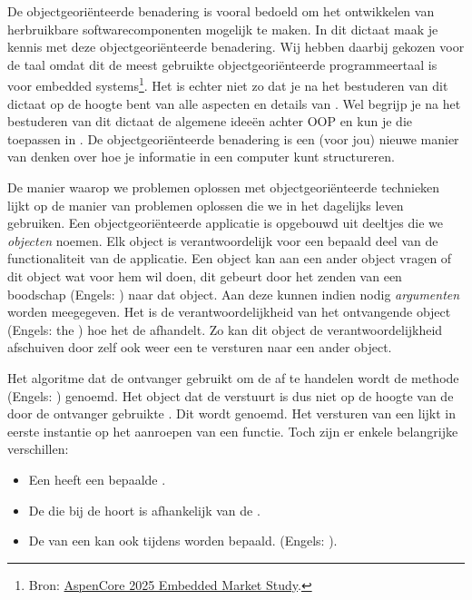 \begin{cpplstShortInline}
De objectgeoriënteerde benadering is vooral bedoeld om het ontwikkelen van herbruikbare softwarecomponenten mogelijk te maken.
In dit dictaat maak je kennis met deze objectgeoriënteerde benadering.
Wij hebben daarbij gekozen voor de taal \Cpp{} omdat dit de meest gebruikte objectgeoriënteerde programmeertaal is voor embedded systems\footnote{%
    Bron: \href{https://github.com/HR-ELEKTRO/ems3/wiki/Documenten/Aspencore_2025_Embedded_Markets_Study.pdf\#page=9}{AspenCore 2025 Embedded Market Study}.
}.
Het is echter niet zo dat je na het bestuderen van dit dictaat op de hoogte bent van alle aspecten en details van \Cpp{}.
Wel begrijp je na het bestuderen van dit dictaat de algemene ideeën achter OOP en kun je die toepassen in \Cpp{}.
De objectgeoriënteerde benadering is een (voor jou) nieuwe manier van denken over hoe je informatie in een computer kunt structureren.

De manier waarop we problemen oplossen met objectgeoriënteerde technieken lijkt op de manier van problemen oplossen die we in het dagelijks leven gebruiken.
Een objectgeoriënteerde applicatie is opgebouwd uit deeltjes die we \emph{objecten} noemen.
Elk object is verantwoordelijk voor een bepaald deel van de functionaliteit van de applicatie.
Een object kan aan een ander object vragen of dit object wat voor hem wil doen, dit gebeurt door het zenden van een boodschap (Engels: \emph{}) naar dat object.
Aan deze  kunnen indien nodig \emph{argumenten} worden meegegeven.
Het is de verantwoordelijkheid van het ontvangende object (Engels: the \emph{}) hoe het de  afhandelt.
Zo kan dit object de verantwoordelijkheid afschuiven door zelf ook weer een  te versturen naar een ander object.

Het algoritme dat de ontvanger gebruikt om de  af te handelen wordt de methode (Engels: \emph{}) genoemd.
Het object dat de  verstuurt is dus niet op de hoogte van de door de ontvanger gebruikte .
Dit wordt \emph{} genoemd.
Het versturen van een  lijkt in eerste instantie op het aanroepen van een functie.
Toch zijn er enkele belangrijke verschillen:
\begin{itemize}
    \item Een  heeft een bepaalde .
    \item De  die bij de  hoort is afhankelijk van de .
    \item De  van een  kan ook tijdens  worden bepaald.
(Engels: \emph{}).
\end{itemize}


\end{cpplstShortInline}
